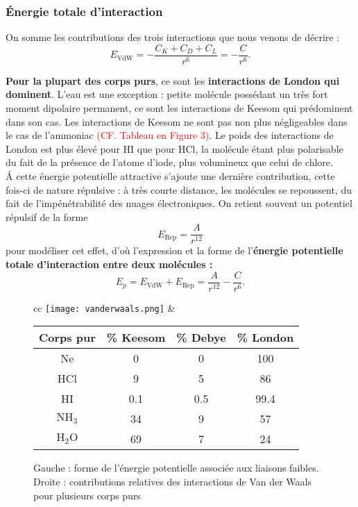 \documentclass[11pt,a4paper]{report}
\begin{document}
\subsubsection{Énergie totale d'interaction}

On somme les contributions des trois interactions que nous venons de décrire :
\begin{equation}
	E_\text{VdW} = -\frac{C_K + C_D + C_L}{r^6} = -\frac{C}{r^6}.
\end{equation}

\textbf{Pour la plupart des corps purs}, ce sont les \textbf{interactions de London qui dominent}. L'eau est une exception : petite molécule possédant un très fort moment dipolaire permanent, ce sont les interactions de Keesom qui prédominent dans son cas. Les interactions de Keesom ne sont pas non plus négligeables dans le cas de l'ammoniac \textcolor{red}{(CF. Tableau en Figure 3)}. Le poids des interactions de London est plus élevé pour HI que pour HCl, la molécule étant plus polarisable du fait de la présence de l'atome d'iode, plus volumineux que celui de chlore.\\

\'A cette énergie potentielle attractive s'ajoute une dernière contribution, cette fois-ci de nature répulsive : à très courte distance, les molécules se repoussent, du fait de l'impénétrabilité des nuages électroniques. On retient souvent un potentiel répulsif de la forme
\begin{equation}
	E_\text{Rep} = \frac{A}{r^{12}}
\end{equation}
pour modéliser cet effet, d'où l'expression et la forme de l'\textbf{énergie potentielle totale d'interaction entre deux molécules :}
\begin{equation}
	\boxed{E_p = E_\text{VdW} + E_\text{Rep} = \frac{A}{r^{12}} -\frac{C}{r^6}}.
\end{equation}

\begin{figure}[h!]
	\begin{center}
	\begin{tabular}{cc}
	\texttt{[image: vanderwaals.png]}	
	&
	\begin{tabular}{|c|c|c|c|}
	\hline	
	Corps pur & \% Keesom & \% Debye & \% London \\
	\hline
	Ne & 0 & 0 & 100 \\
	\hline
	HCl & 9 & 5 & 86\\
	\hline
	HI & 0.1 & 0.5 & 99.4\\
	\hline
	$\text{NH}_3$ & 34 & 9 & 57\\
	\hline
	$\text{H}_2\text{O}$ & 69 & 7 & 24\\
	\hline
	\end{tabular}
	\end{tabular}
	\end{center}
	\caption{Gauche : forme de l'énergie potentielle associée aux liaisons faibles. Droite : 				contributions relatives des interactions de Van der Waals pour plusieurs corps purs}
\end{figure}
\end{document}
